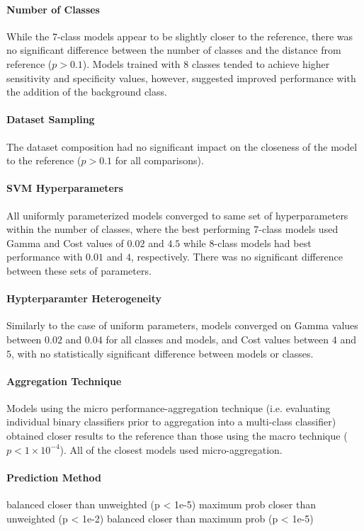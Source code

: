 \paragraph{Number of Classes}
While the 7-class models appear to be slightly closer to the reference, there was no significant difference between
the number of classes and the distance from reference ($p > 0.1$). Models trained with 8 classes tended to achieve
higher sensitivity and specificity values, however, suggested improved performance with the addition of the background
class. 

\paragraph{Dataset Sampling}
The dataset composition had no significant impact on the closeness of the model to the reference ($p > 0.1$ for all
comparisons).

\paragraph{SVM Hyperparameters}
All uniformly parameterized models converged to same set of hyperparameters within the number of classes, where the
best performing 7-class models used Gamma and Cost values of $0.02$ and $4.5$ while 8-class models had best performance
with $0.01$ and $4$, respectively. There was no significant difference between these sets of parameters.

\paragraph{Hypterparamter Heterogeneity}
Similarly to the case of uniform parameters, models converged on Gamma values between $0.02$ and $0.04$ for all classes
and models, and Cost values between $4$ and $5$, with no statistically significant difference between models or classes.

\paragraph{Aggregation Technique}
Models using the micro performance-aggregation technique (i.e. evaluating individual binary classifiers prior to
aggregation into a multi-class classifier) obtained closer results to the reference than those using the macro
technique ($p < 1\times 10^{-4}$). All of the closest models used micro-aggregation.

\paragraph{Prediction Method}
balanced closer than unweighted (p < 1e-5)
maximum prob closer than unweighted (p < 1e-2)
balanced closer than maximum prob (p < 1e-5) 

